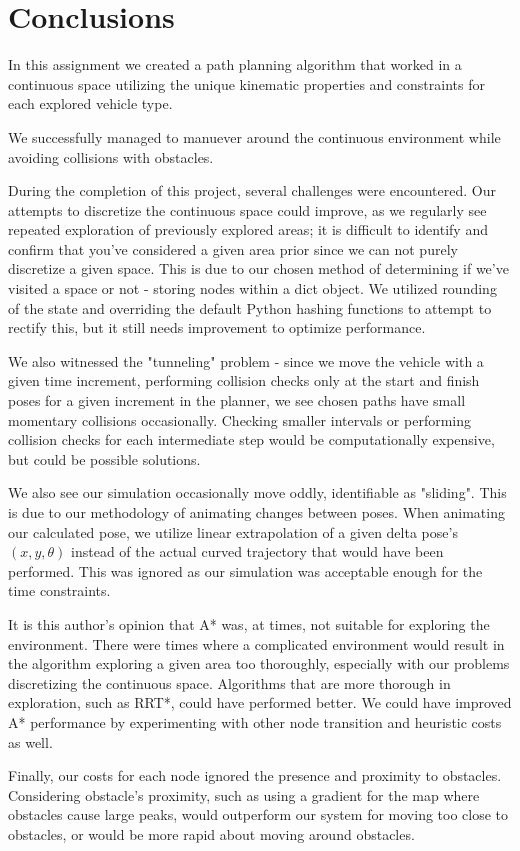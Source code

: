 \documentclass{article}
\begin{document}
\section*{Conclusions}

In this assignment we created a path planning algorithm that worked in a continuous space utilizing the unique kinematic properties and constraints for each explored vehicle type.

We successfully managed to manuever around the continuous environment while avoiding collisions with obstacles.

During the completion of this project, several challenges were encountered. Our attempts to discretize the continuous space could improve, as we regularly see repeated exploration of previously explored areas; it is difficult to identify and confirm that you've considered a given area prior since we can not purely discretize a given space. This is due to our chosen method of determining if we've visited a space or not - storing nodes within a dict object. We utilized rounding of the state and overriding the default Python hashing functions to attempt to rectify this, but it still needs improvement to optimize performance.

We also witnessed the "tunneling" problem - since we move the vehicle with a given time increment, performing collision checks only at the start and finish poses for a given increment in the planner, we see chosen paths have small momentary collisions occasionally. Checking smaller intervals or performing collision checks for each intermediate step would be computationally expensive, but could be possible solutions.

We also see our simulation occasionally move oddly, identifiable as "sliding". This is due to our methodology of animating changes between poses. When animating our calculated pose, we utilize linear extrapolation of a given delta pose's $(x, y, \theta)$ instead of the actual curved trajectory that would have been performed. This was ignored as our simulation was acceptable enough for the time constraints.

It is this author's opinion that A* was, at times, not suitable for exploring the environment. There were times where a complicated environment would result in the algorithm exploring a given area too thoroughly, especially with our problems discretizing the continuous space. Algorithms that are more thorough in exploration, such as RRT*, could have performed better. We could have improved A* performance by experimenting with other node transition and heuristic costs as well.

Finally, our costs for each node ignored the presence and proximity to obstacles. Considering obstacle's proximity, such as using a gradient for the map where obstacles cause large peaks, would outperform our system for moving too close to obstacles, or would be more rapid about moving around obstacles.
\end{document}
